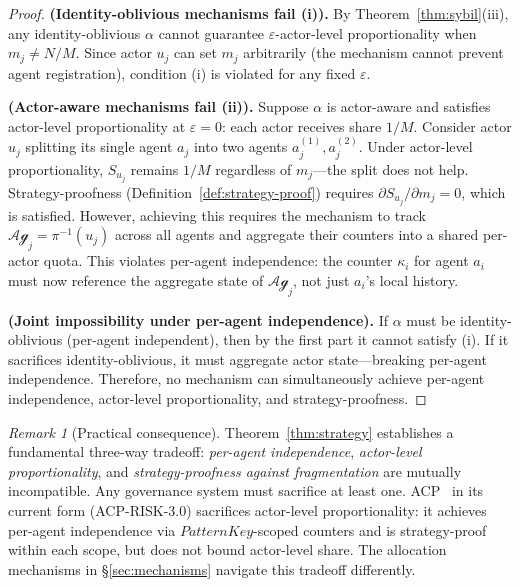 \documentclass[11pt]{article}
\theoremstyle{plain}
\theoremstyle{definition}
\theoremstyle{remark}
\newtheorem{remark}[theorem]{Remark}
\newcommand{\Agents}{\mathcal{Ag}}         %
\newcommand{\Share}[1]{S_{#1}}             %
\newcommand{\alloc}{\alpha}                %
\newcommand{\owner}{\pi}                   %
\newcommand{\PatKey}{\mathit{PatternKey}}  %
\begin{document}
\begin{proof}
\textbf{(Identity-oblivious mechanisms fail (i)).}
By Theorem~\ref{thm:sybil}(iii), any identity-oblivious $\alloc$
cannot guarantee $\varepsilon$-actor-level proportionality when
$m_j \neq N/M$.  Since actor $u_j$ can set $m_j$ arbitrarily (the
mechanism cannot prevent agent registration), condition (i) is
violated for any fixed $\varepsilon$.

\textbf{(Actor-aware mechanisms fail (ii)).}
Suppose $\alloc$ is actor-aware and satisfies actor-level
proportionality at $\varepsilon = 0$: each actor receives share
$1/M$.  Consider actor $u_j$ splitting its single agent $a_j$ into
two agents $a_j^{(1)}, a_j^{(2)}$.  Under actor-level proportionality,
$\Share{u_j}$ remains $1/M$ regardless of $m_j$---the split does not
help.  Strategy-proofness (Definition~\ref{def:strategy-proof})
requires $\partial \Share{u_j} / \partial m_j = 0$, which is satisfied.
However, achieving this requires the mechanism to track $\Agents_j =
\owner^{-1}(u_j)$ across all agents and aggregate their counters into
a shared per-actor quota.  This violates per-agent independence: the
counter $\kappa_i$ for agent $a_i$ must now reference the aggregate
state of $\Agents_j$, not just $a_i$'s local history.

\textbf{(Joint impossibility under per-agent independence).}
If $\alloc$ must be identity-oblivious (per-agent independent), then
by the first part it cannot satisfy (i).  If it sacrifices
identity-oblivious, it must aggregate actor state---breaking per-agent
independence.  Therefore, no mechanism can simultaneously achieve
per-agent independence, actor-level proportionality, and
strategy-proofness.
\end{proof}

\begin{remark}[Practical consequence]
\label{rem:strategy-practical}
Theorem~\ref{thm:strategy} establishes a fundamental three-way
tradeoff: \emph{per-agent independence}, \emph{actor-level proportionality},
and \emph{strategy-proofness against fragmentation} are mutually
incompatible.  Any governance system must sacrifice at least one.
ACP~\citep{fernandez2026b} in its current form (ACP-RISK-3.0) sacrifices
actor-level proportionality: it achieves per-agent independence via
$\PatKey$-scoped counters and is strategy-proof within each scope, but
does not bound actor-level share.  The allocation mechanisms in
\S\ref{sec:mechanisms} navigate this tradeoff differently.
\end{remark}
\end{document}
